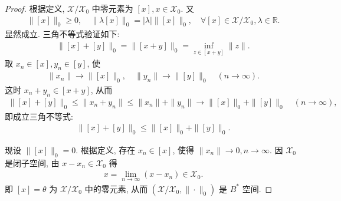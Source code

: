 \documentclass[../../main.tex]{subfiles}%
\begin{document}
\begin{proof}

根据定义, $\mathscr{X}/\mathscr{X}_0$ 中零元素为 $[x],x \in \mathscr{X}_0$. 又
\begin{align*}
\|[x]\|_0 \geqslant 0, \quad \|\lambda [x]\|_0 = |\lambda| \| [x]\|_0, \quad \forall [x] \in \mathscr{X}/\mathscr{X}_0, \lambda \in \mathbb{R}.
\end{align*}
显然成立. 三角不等式验证如下:
\begin{align*}
\|[x] + [y]\|_0 = \|[x+y]\|_0 = \inf_{z \in [x+y]} \|z\|.
\end{align*}
取 $x_n \in [x], y_n \in [y]$, 使
\begin{align*}
\|x_n\| \to \|[x]\|_0, \quad \|y_n\| \to \|[y]\|_0 \quad (n \to \infty).
\end{align*}
这时 $x_n + y_n \in [x+y]$, 从而
\begin{align*}
\|[x] + [y]\|_0 \leqslant \|x_n + y_n\| 
\leqslant \|x_n\| + \|y_n\| \to \|[x]\|_0 + \|[y]\|_0 \quad (n \to \infty),
\end{align*}
即成立三角不等式:
\begin{align*}
\|[x] + [y]\|_0 \leqslant \|[x]\|_0 + \|[y]\|_0.
\end{align*}

现设 $\|[x]\|_0 = 0$. 根据定义, 存在 $x_n \in [x]$, 使得 $\|x_n\| \to 0, n \to \infty$. 因 $\mathscr{X}_0$ 是闭子空间, 由 $x - x_n \in \mathscr{X}_0$ 得
\begin{align*}
x = \lim\limits_{n \to \infty} (x - x_n) \in \mathscr{X}_0.
\end{align*}
即 $[x] = \theta$ 为 $\mathscr{X}/\mathscr{X}_0$ 中的零元素, 从而 $(\mathscr{X}/\mathscr{X}_0,\|\cdot\|_0)$ 是 $B^*$ 空间.


\end{proof}
\end{document}
